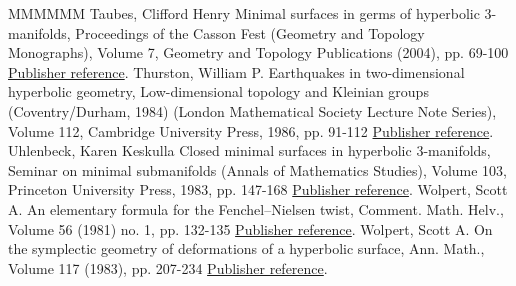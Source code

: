 \documentclass[11pt]{article}
\theoremstyle{definition}
\numberwithin{equation}{section}
\numberwithin{figure}{section}
\numberwithin{table}{section}
\begin{document}
\begin{thebibliography}{MMMMMM}
 Taubes, Clifford Henry Minimal surfaces in germs of hyperbolic 3-manifolds, Proceedings of the Casson Fest (Geometry and Topology Monographs), Volume 7, Geometry and Topology Publications (2004), pp. 69-100 \href{https://ahl.centre-mersenne.org/item/AHL_2020__3__873_0/#taubes}{Publisher reference}.
 Thurston, William P. Earthquakes in two-dimensional hyperbolic geometry, Low-dimensional topology and Kleinian groups (Coventry/Durham, 1984) (London Mathematical Society Lecture Note Series), Volume 112, Cambridge University Press, 1986, pp. 91-112 \href{https://ahl.centre-mersenne.org/item/AHL_2020__3__873_0/#thurstonearth}{Publisher reference}.
 Uhlenbeck, Karen Keskulla Closed minimal surfaces in hyperbolic 3-manifolds, Seminar on minimal submanifolds (Annals of Mathematics Studies), Volume 103, Princeton University Press, 1983, pp. 147-168 \href{https://ahl.centre-mersenne.org/item/AHL_2020__3__873_0/#uhlenbeck}{Publisher reference}.
 Wolpert, Scott A. An elementary formula for the Fenchel–Nielsen twist, Comment. Math. Helv., Volume 56 (1981) no. 1, pp. 132-135 \href{https://ahl.centre-mersenne.org/item/AHL_2020__3__873_0/#wolpertelementary}{Publisher reference}.
 Wolpert, Scott A. On the symplectic geometry of deformations of a hyperbolic surface, Ann. Math., Volume 117 (1983), pp. 207-234 \href{https://ahl.centre-mersenne.org/item/AHL_2020__3__873_0/#wolpertformula}{Publisher reference}.
\end{thebibliography}
\end{document}
